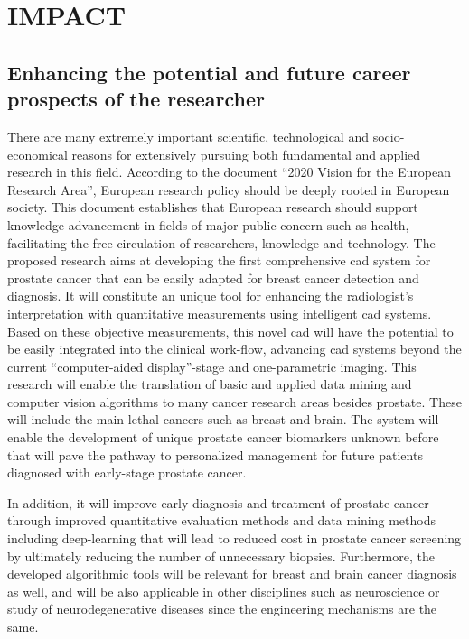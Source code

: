 \section{IMPACT}
\label{sec:impact}

\subsection{Enhancing the potential and future career prospects of the researcher}
\label{sec:enhancement}

There are many extremely important scientific, technological and socio-economical reasons for extensively pursuing both fundamental and applied research in this field.
According to the document ``2020 Vision for the European Research Area'', European research policy should be deeply rooted in European society.
This document establishes that European research should support knowledge advancement in fields of major public concern such as health, facilitating the free circulation of researchers, knowledge and technology.
The proposed research aims at developing the first comprehensive \ac{cad} system for prostate cancer that can be easily adapted for breast cancer detection and diagnosis.
It will constitute an unique tool for enhancing the radiologist's interpretation with quantitative measurements using intelligent \ac{cad} systems.
Based on these objective measurements, this novel \ac{cad} will have the potential to be easily integrated into the clinical work-flow, advancing \ac{cad} systems beyond the current ``computer-aided display''-stage and one-parametric imaging.
This research will enable the translation of basic and applied data mining and computer vision algorithms to many cancer research areas besides prostate. 
These will include the main lethal cancers such as breast and brain.
The system will enable the development of unique prostate cancer biomarkers unknown before that will pave the pathway to personalized management for future patients diagnosed with early-stage prostate cancer.

In addition, it will improve early diagnosis and treatment of prostate cancer through improved quantitative evaluation methods and data mining methods including deep-learning that will lead to reduced cost in prostate cancer screening by ultimately reducing the number of unnecessary biopsies.
Furthermore, the developed algorithmic tools will be relevant for breast and brain cancer diagnosis as well, and will be also applicable in other disciplines such as neuroscience or study of neurodegenerative diseases since the engineering mechanisms are the same.

